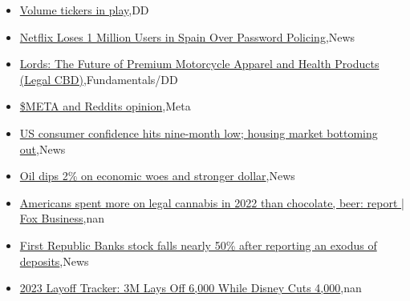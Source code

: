 \documentclass{article}%
\begin{document}
%
\begin{itemize}%
\item%
\href{https://reddit.com/r/wallstreetbets/comments/130kodf/volume\_tickers\_in\_play/}{Volume tickers in play},DD%
\item%
\href{https://reddit.com/r/wallstreetbets/comments/130iwfm/netflix\_loses\_1\_million\_users\_in\_spain\_over/}{Netflix Loses 1 Million Users in Spain Over Password Policing},News%
\item%
\href{https://reddit.com/r/StockMarket/comments/130kgms/lords\_the\_future\_of\_premium\_motorcycle\_apparel/}{Lords: The Future of Premium Motorcycle Apparel and Health Products (Legal CBD)},Fundamentals/DD%
\item%
\href{https://reddit.com/r/StockMarket/comments/12zyub8/meta\_and\_reddits\_opinion/}{\$META and Reddits opinion},Meta%
\item%
\href{https://reddit.com/r/Economics/comments/12z5a7s/us\_consumer\_confidence\_hits\_ninemonth\_low\_housing/}{US consumer confidence hits nine-month low; housing market bottoming out},News%
\item%
\href{https://reddit.com/r/Economics/comments/12z2n4g/oil\_dips\_2\_on\_economic\_woes\_and\_stronger\_dollar/}{Oil dips 2\% on economic woes and stronger dollar},News%
\item%
\href{https://reddit.com/r/Economics/comments/12z239d/americans\_spent\_more\_on\_legal\_cannabis\_in\_2022/}{Americans spent more on legal cannabis in 2022 than chocolate, beer: report | Fox Business},nan%
\item%
\href{https://reddit.com/r/Economics/comments/12z1c9p/first\_republic\_banks\_stock\_falls\_nearly\_50\_after/}{First Republic Banks stock falls nearly 50\% after reporting an exodus of deposits},News%
\item%
\href{https://reddit.com/r/Economics/comments/12yy3bs/2023\_layoff\_tracker\_3m\_lays\_off\_6000\_while\_disney/}{2023 Layoff Tracker: 3M Lays Off 6,000 While Disney Cuts 4,000},nan%
\end{itemize}%
\end{document}
